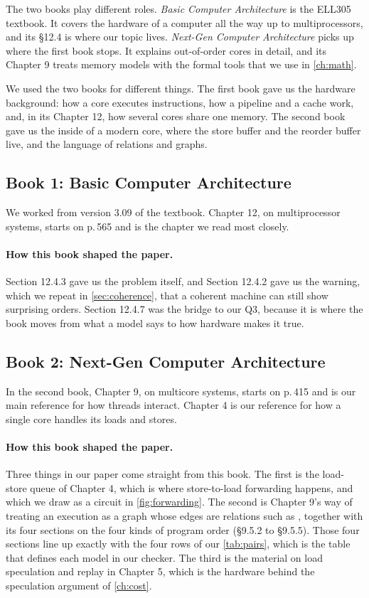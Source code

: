The two books play different roles. \emph{Basic Computer Architecture}\cite{sarangiBasic} is the ELL305 textbook. It covers the hardware of a computer all the way up to multiprocessors, and its \S12.4 is where our topic lives. \emph{Next-Gen Computer Architecture}\cite{sarangiNextGen} picks up where the first book stops. It explains out-of-order cores in detail, and its Chapter 9 treats memory models with the formal tools that we use in \cref{ch:math}.

We used the two books for different things. The first book gave us the hardware background: how a core executes instructions, how a pipeline and a cache work, and, in its Chapter 12, how several cores share one memory. The second book gave us the inside of a modern core, where the store buffer and the reorder buffer live, and the language of relations and graphs.

\subsection{Book 1: Basic Computer Architecture}

We worked from version 3.09 of the textbook\cite{sarangiBasic}. Chapter 12, on multiprocessor systems, starts on p.\,565 and is the chapter we read most closely.

\paragraph{How this book shaped the paper.} Section 12.4.3 gave us the problem itself, and Section 12.4.2 gave us the warning, which we repeat in \cref{sec:coherence}, that a coherent machine can still show surprising orders. Section 12.4.7 was the bridge to our Q3, because it is where the book moves from what a model says to how hardware makes it true.

\subsection{Book 2: Next-Gen Computer Architecture}

In the second book\cite{sarangiNextGen}, Chapter 9, on multicore systems, starts on p.\,415 and is our main reference for how threads interact. Chapter 4 is our reference for how a single core handles its loads and stores.

\paragraph{How this book shaped the paper.} Three things in our paper come straight from this book. The first is the load-store queue of Chapter 4, which is where store-to-load forwarding happens, and which we draw as a circuit in \cref{fig:forwarding}. The second is Chapter 9's way of treating an execution as a graph whose edges are relations such as \rf, together with its four sections on the four kinds of program order (\S9.5.2 to \S9.5.5). Those four sections line up exactly with the four rows of our \cref{tab:pairs}, which is the table that defines each model in our checker. The third is the material on load speculation and replay in Chapter 5, which is the hardware behind the speculation argument of \cref{ch:cost}.

